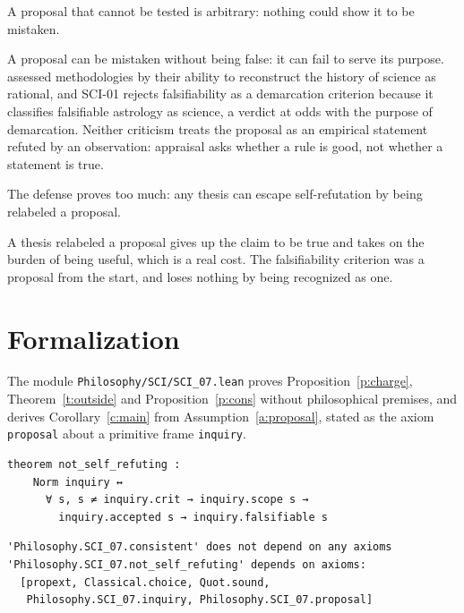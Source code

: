 \documentclass{situationist-preprint}
\begin{document}
\begin{objection}
A proposal that cannot be tested is arbitrary: nothing could show it to be mistaken.
\end{objection}

\begin{reply}
A proposal can be mistaken without being false: it can fail to serve its purpose. \citet{Lakatos1971} assessed methodologies by their ability to reconstruct the history of science as rational, and SCI-01 rejects falsifiability as a demarcation criterion because it classifies falsifiable astrology as science, a verdict at odds with the purpose of demarcation. Neither criticism treats the proposal as an empirical statement refuted by an observation: appraisal asks whether a rule is good, not whether a statement is true.
\end{reply}

\begin{objection}
The defense proves too much: any thesis can escape self-refutation by being relabeled a proposal.
\end{objection}

\begin{reply}
A thesis relabeled a proposal gives up the claim to be true and takes on the burden of being useful, which is a real cost. The falsifiability criterion was a proposal from the start, and loses nothing by being recognized as one.
\end{reply}

\section{Formalization}

The module \nolinkurl{Philosophy/SCI/SCI_07.lean} proves Proposition~\ref{p:charge}, Theorem~\ref{t:outside} and Proposition~\ref{p:cons} without philosophical premises, and derives Corollary~\ref{c:main} from Assumption~\ref{a:proposal}, stated as the axiom \texttt{proposal} about a primitive frame \texttt{inquiry}.

\begin{lstlisting}
theorem not_self_refuting :
    Norm inquiry ↔
      ∀ s, s ≠ inquiry.crit → inquiry.scope s →
        inquiry.accepted s → inquiry.falsifiable s
\end{lstlisting}

\begin{lstlisting}
'Philosophy.SCI_07.consistent' does not depend on any axioms
'Philosophy.SCI_07.not_self_refuting' depends on axioms:
  [propext, Classical.choice, Quot.sound,
   Philosophy.SCI_07.inquiry, Philosophy.SCI_07.proposal]
\end{lstlisting}
\end{document}
